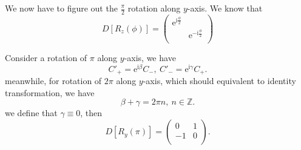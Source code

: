 We now have to figure out the $\frac{\pi}{2}$ rotation along $y$-axis. We know that 
\begin{equation}
  D \left[ R_z\left( \phi \right)  \right] = \begin{pmatrix}
   \mathrm{e}^{\mathrm{i} \frac{\phi}{2}} & \\
    & \mathrm{e}^{-\mathrm{i} \frac{\phi}{2}}\\
  \end{pmatrix}
\end{equation}

Consider a rotation of $\pi$ along $y$-axis, we have
\begin{equation}
  C'_{+} = \mathrm{e}^{\mathrm{i} \beta} C_{-} ,\ C'_{-} = \mathrm{e}^{\mathrm{i} \gamma} C_{+}.
\end{equation}
meanwhile, for rotation of $2\pi$ along $y$-axis, which should equivalent to identity transformation, we have
\begin{equation}
    \beta + \gamma = 2\pi n,\ n \in \mathbb{Z}. 
\end{equation}
we define that $\gamma \equiv 0$, then
\begin{equation}
  D \left[ R_y\left( \pi \right)  \right] = \begin{pmatrix}
   0 & 1\\
   -1 & 0\\
  \end{pmatrix}.
\end{equation}